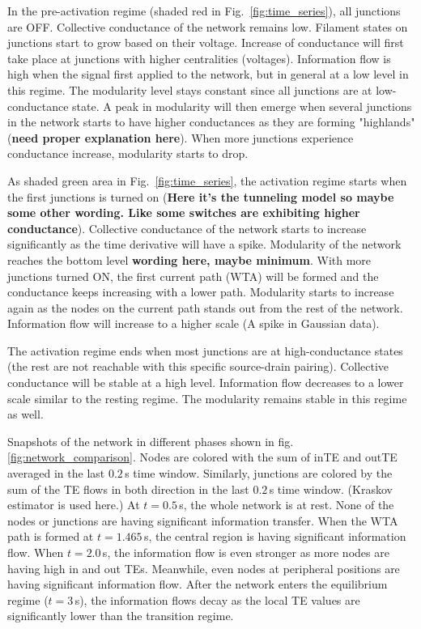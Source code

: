 \documentclass[fleqn,10pt,  reprint, amsmath,amssymb,aps, floatfix]{wlscirep}
\begin{document}
In the pre-activation regime (shaded red in Fig.~\ref{fig:time_series}), all junctions are OFF. Collective conductance of the network remains low. Filament states on junctions start to grow based on their voltage. Increase of conductance will first take place at junctions with higher centralities (voltages). Information flow is high when the signal first applied to the network, but in general at a low level in this regime. The modularity level stays constant since all junctions are at low-conductance state. A peak in modularity will then emerge when several junctions in the network starts to have higher conductances as they are forming "highlands" (\textbf{need proper explanation here}). When more junctions experience conductance increase, modularity starts to drop.

As shaded green area in Fig.~\ref{fig:time_series}, the activation regime starts when the first junctions is turned on (\textbf{Here it's the tunneling model so maybe some other wording. Like some switches are exhibiting higher conductance}). Collective conductance of the network starts to increase significantly as the time derivative will have a spike. Modularity of the network reaches the bottom level \textbf{wording here, maybe minimum}. With more junctions turned ON, the first current path (WTA) will be formed and the conductance keeps increasing with a lower path. Modularity starts to increase again as the nodes on the current path stands out from the rest of the network. Information flow will increase to a higher scale (A spike in Gaussian data). 

The activation regime ends when most junctions are at high-conductance states (the rest are not reachable with this specific source-drain pairing). Collective conductance will be stable at a high level. Information flow decreases to a lower scale similar to the resting regime. The modularity remains stable in this regime as well.

Snapshots of the network in different phases shown in fig. \ref{fig:network_comparison}. Nodes are colored with the sum of inTE and outTE averaged in the last $0.2\,$s time window. Similarly, junctions are colored by the sum of the TE flows in both direction in the last $0.2\,$s time window. (Kraskov estimator is used here.) At $t= 0.5 \,$s, the whole network is at rest. None of the nodes or junctions are having significant information transfer. When the WTA path is formed at $t = 1.465 \,$s, the central region is having significant information flow. When $t = 2.0 \,$s, the information flow is even stronger as more nodes are having high in and out TEs. Meanwhile, even nodes at peripheral positions are having significant information flow. After the network enters the equilibrium regime ($t = 3 \,$s), the information flows decay as the local TE values are significantly lower than the transition regime.
\end{document}
